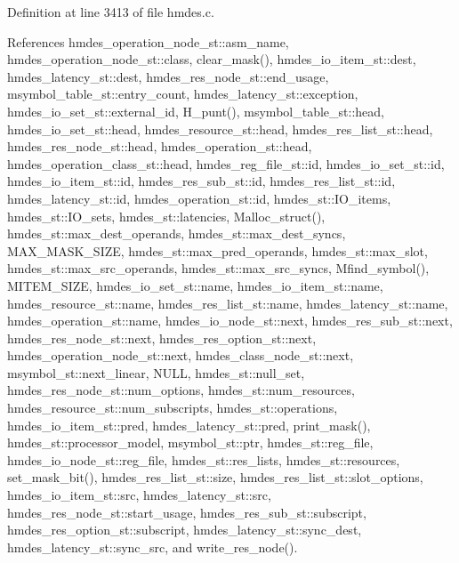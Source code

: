 Definition at line 3413 of file hmdes.c.

References hmdes\_\-operation\_\-node\_\-st::asm\_\-name, hmdes\_\-operation\_\-node\_\-st::class, clear\_\-mask(), hmdes\_\-io\_\-item\_\-st::dest, hmdes\_\-latency\_\-st::dest, hmdes\_\-res\_\-node\_\-st::end\_\-usage, msymbol\_\-table\_\-st::entry\_\-count, hmdes\_\-latency\_\-st::exception, hmdes\_\-io\_\-set\_\-st::external\_\-id, H\_\-punt(), msymbol\_\-table\_\-st::head, hmdes\_\-io\_\-set\_\-st::head, hmdes\_\-resource\_\-st::head, hmdes\_\-res\_\-list\_\-st::head, hmdes\_\-res\_\-node\_\-st::head, hmdes\_\-operation\_\-st::head, hmdes\_\-operation\_\-class\_\-st::head, hmdes\_\-reg\_\-file\_\-st::id, hmdes\_\-io\_\-set\_\-st::id, hmdes\_\-io\_\-item\_\-st::id, hmdes\_\-res\_\-sub\_\-st::id, hmdes\_\-res\_\-list\_\-st::id, hmdes\_\-latency\_\-st::id, hmdes\_\-operation\_\-st::id, hmdes\_\-st::IO\_\-items, hmdes\_\-st::IO\_\-sets, hmdes\_\-st::latencies, Malloc\_\-struct(), hmdes\_\-st::max\_\-dest\_\-operands, hmdes\_\-st::max\_\-dest\_\-syncs, MAX\_\-MASK\_\-SIZE, hmdes\_\-st::max\_\-pred\_\-operands, hmdes\_\-st::max\_\-slot, hmdes\_\-st::max\_\-src\_\-operands, hmdes\_\-st::max\_\-src\_\-syncs, Mfind\_\-symbol(), MITEM\_\-SIZE, hmdes\_\-io\_\-set\_\-st::name, hmdes\_\-io\_\-item\_\-st::name, hmdes\_\-resource\_\-st::name, hmdes\_\-res\_\-list\_\-st::name, hmdes\_\-latency\_\-st::name, hmdes\_\-operation\_\-st::name, hmdes\_\-io\_\-node\_\-st::next, hmdes\_\-res\_\-sub\_\-st::next, hmdes\_\-res\_\-node\_\-st::next, hmdes\_\-res\_\-option\_\-st::next, hmdes\_\-operation\_\-node\_\-st::next, hmdes\_\-class\_\-node\_\-st::next, msymbol\_\-st::next\_\-linear, NULL, hmdes\_\-st::null\_\-set, hmdes\_\-res\_\-node\_\-st::num\_\-options, hmdes\_\-st::num\_\-resources, hmdes\_\-resource\_\-st::num\_\-subscripts, hmdes\_\-st::operations, hmdes\_\-io\_\-item\_\-st::pred, hmdes\_\-latency\_\-st::pred, print\_\-mask(), hmdes\_\-st::processor\_\-model, msymbol\_\-st::ptr, hmdes\_\-st::reg\_\-file, hmdes\_\-io\_\-node\_\-st::reg\_\-file, hmdes\_\-st::res\_\-lists, hmdes\_\-st::resources, set\_\-mask\_\-bit(), hmdes\_\-res\_\-list\_\-st::size, hmdes\_\-res\_\-list\_\-st::slot\_\-options, hmdes\_\-io\_\-item\_\-st::src, hmdes\_\-latency\_\-st::src, hmdes\_\-res\_\-node\_\-st::start\_\-usage, hmdes\_\-res\_\-sub\_\-st::subscript, hmdes\_\-res\_\-option\_\-st::subscript, hmdes\_\-latency\_\-st::sync\_\-dest, hmdes\_\-latency\_\-st::sync\_\-src, and write\_\-res\_\-node().
